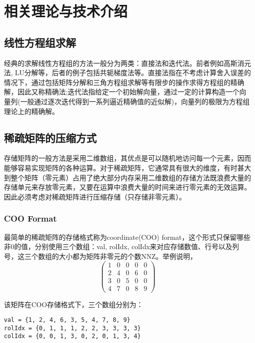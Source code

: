 \chapter{相关理论与技术介绍}

\section{线性方程组求解}

经典的求解线性方程组的方法一般分为两类：直接法和迭代法。前者例如高斯消元法, LU分解等，后者的例子包括共轭梯度法等。直接法指在不考虑计算舍入误差的情况下，通过包括矩阵分解和三角方程组求解等有限步的操作求得方程组的精确解，因此又称精确法;迭代法指给定一个初始解向量，通过一定的计算构造一个向量列(一般通过逐次迭代得到一系列逼近精确值的近似解)，向量列的极限为方程组理论上的精确解。

\section{稀疏矩阵的压缩方式}

存储矩阵的一般方法是采用二维数组，其优点是可以随机地访问每一个元素，因而能够容易实现矩阵的各种运算。对于稀疏矩阵，它通常具有很大的维度，有时甚大到整个矩阵（零元素）占用了绝大部分内存采用二维数组的存储方法既浪费大量的存储单元来存放零元素，又要在运算中浪费大量的时间来进行零元素的无效运算。因此必须考虑对稀疏矩阵进行压缩存储（只存储非零元素）。

\subsection{COO Format}

最简单的稀疏矩阵的存储格式称为coordinate(COO) format，这个形式只保留哪些非0的值，分别使用三个数组：val, rolIdx, colIdx来对应存储数值、行号以及列号，这三个数组的大小都为矩阵非零元的个数NNZ。举例说明，
$$
\begin{pmatrix}
    \label{稀疏矩阵例子}
    1 & 0 & 0 & 0 & 0 \\
    2 & 4 & 0 & 6 & 0 \\
    3 & 0 & 5 & 0 & 0 \\
    4 & 7 & 0 & 8 & 9
\end{pmatrix}
$$

该矩阵在COO存储格式下，三个数组分别为：
\begin{lstlisting}[title=COO Format, frame=single]
val = {1, 2, 4, 6, 3, 5, 4, 7, 8, 9}
rolIdx = {0, 1, 1, 1, 2, 2, 3, 3, 3, 3}
colIdx = {0, 0, 1, 3, 0, 2, 0, 1, 3, 4}
\end{lstlisting}

